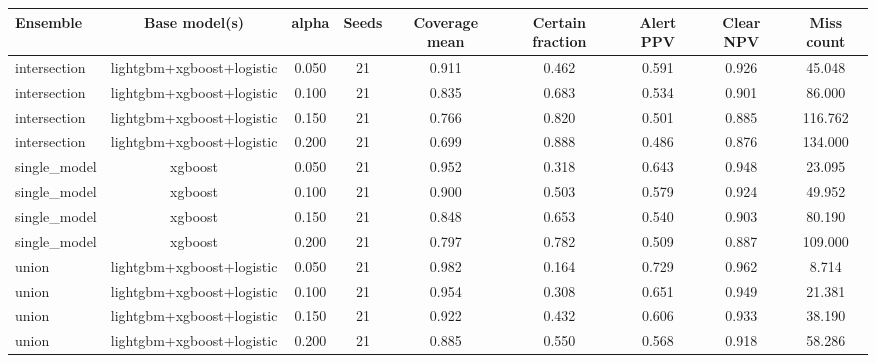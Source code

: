 \begin{tabular}{@{}lcccccccc@{}}
\toprule
Ensemble & Base model(s) & alpha & Seeds & Coverage mean & Certain fraction & Alert PPV & Clear NPV & Miss count\\
\midrule
intersection & lightgbm+xgboost+logistic & 0.050 & 21 & 0.911 & 0.462 & 0.591 & 0.926 & 45.048\\
intersection & lightgbm+xgboost+logistic & 0.100 & 21 & 0.835 & 0.683 & 0.534 & 0.901 & 86.000\\
intersection & lightgbm+xgboost+logistic & 0.150 & 21 & 0.766 & 0.820 & 0.501 & 0.885 & 116.762\\
intersection & lightgbm+xgboost+logistic & 0.200 & 21 & 0.699 & 0.888 & 0.486 & 0.876 & 134.000\\
single\_model & xgboost & 0.050 & 21 & 0.952 & 0.318 & 0.643 & 0.948 & 23.095\\
single\_model & xgboost & 0.100 & 21 & 0.900 & 0.503 & 0.579 & 0.924 & 49.952\\
single\_model & xgboost & 0.150 & 21 & 0.848 & 0.653 & 0.540 & 0.903 & 80.190\\
single\_model & xgboost & 0.200 & 21 & 0.797 & 0.782 & 0.509 & 0.887 & 109.000\\
union & lightgbm+xgboost+logistic & 0.050 & 21 & 0.982 & 0.164 & 0.729 & 0.962 & 8.714\\
union & lightgbm+xgboost+logistic & 0.100 & 21 & 0.954 & 0.308 & 0.651 & 0.949 & 21.381\\
union & lightgbm+xgboost+logistic & 0.150 & 21 & 0.922 & 0.432 & 0.606 & 0.933 & 38.190\\
union & lightgbm+xgboost+logistic & 0.200 & 21 & 0.885 & 0.550 & 0.568 & 0.918 & 58.286\\
\bottomrule
\end{tabular}
